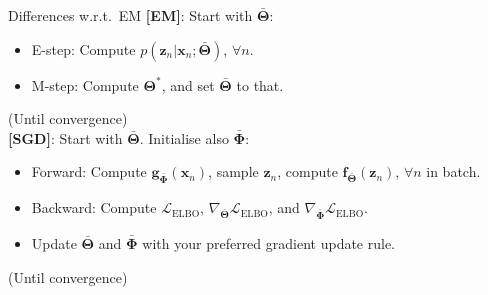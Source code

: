 \documentclass{beamer}
\newcommand{\bs}[1]{\boldsymbol{#1}}
\begin{document}
\begin{frame}{Differences w.r.t.\ EM}
\textbf{[EM]}: Start with $\bar{\bs{\Theta}}$:
\begin{itemize}
 \item E-step: Compute $p(\bs{z}_n|\bs{x}_n;\bar{\bs{\Theta}})$, $\forall n$.
 \item M-step: Compute $\bs{\Theta}^*$, and set $\bar{\bs{\Theta}}$ to that.
\end{itemize}
(Until convergence)\vspace{5mm}\\

\textbf{[SGD]}: Start with $\bar{\bs{\Theta}}$. Initialise also $\bar{\bs{\Phi}}$:
\begin{itemize}
 \item Forward: Compute $\bs{g}_{\bar{\bs{\Phi}}}(\bs{x}_n)$, sample $\bs{z}_n$, compute $\bs{f}_{\bar{\bs{\Theta}}}(\bs{z}_n)$, $\forall n$ in batch.
 \item Backward: Compute $\mathcal{L}_{\text{ELBO}}$, $\nabla_{\bar{\bs{\Theta}}}\mathcal{L}_{\text{ELBO}}$, and $\nabla_{\bar{\bs{\Phi}}}\mathcal{L}_{\text{ELBO}}$.
 \item Update $\bar{\bs{\Theta}}$ and $\bar{\bs{\Phi}}$ with your preferred gradient update rule.
\end{itemize}
(Until convergence)\\
\end{frame}
\end{document}
